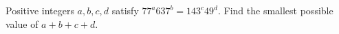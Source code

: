 Positive integers $a,b,c,d$ satisfy $77^a637^b=143^c49^d$. Find the smallest possible value of $a+b+c+d$.
